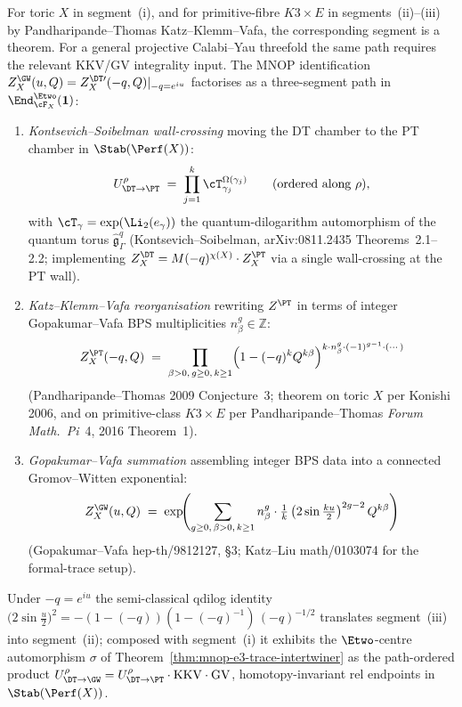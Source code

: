 \begin{theorem}
\label{thm:mnop-homotopy-three-segments}
For toric $X$ in segment~\textup{(i)}, and for primitive-fibre
$K3\times E$ in segments~\textup{(ii)}--\textup{(iii)} by
Pandharipande--Thomas Katz--Klemm--Vafa, the corresponding segment is a
theorem. For a general projective Calabi--Yau threefold the same path
requires the relevant KKV/GV integrality input.
The MNOP identification
$Z^{\GW}_X(u, Q) = Z^{\DT\prime}_X(-q, Q)|_{-q = e^{iu}}$ factorises
as a three-segment path in $\End^{\Etwo}_{\cF_X}(\mathbf{1})$:
\begin{enumerate}[label=\textup{(\roman*)}]
\item \emph{Kontsevich--Soibelman wall-crossing} moving the DT chamber
to the PT chamber in $\Stab(\Perf(X))$:
\[
 U^\rho_{\DT\to\PT}
 \;=\; \prod_{j=1}^k \cT_{\gamma_j}^{\Omega(\gamma_j)}
 \qquad (\text{ordered along } \rho),
\]
with $\cT_\gamma = \exp(\Li_2(e_\gamma))$ the quantum-dilogarithm
automorphism of the quantum torus $\widehat{\mathfrak{g}}^q_\Gamma$
(Kontsevich--Soibelman, arXiv:0811.2435 Theorems~2.1--2.2;
implementing $Z^{\DT}_X = M(-q)^{\chi(X)} \cdot Z^{\PT}_X$ via a
single wall-crossing at the PT wall).
\item \emph{Katz--Klemm--Vafa reorganisation} rewriting $Z^{\PT}$ in
terms of integer Gopakumar--Vafa BPS multiplicities
$n^g_\beta\in\mathbb{Z}$:
\[
 Z^{\PT}_X(-q, Q)
 \;=\; \prod_{\beta > 0,\, g\geq 0,\, k\geq 1}
 \Bigl(1 - (-q)^k Q^{k\beta}\Bigr)^{k\cdot n^g_\beta\cdot(-1)^{g-1}\cdot(\cdots)}
\]
(Pandharipande--Thomas 2009 Conjecture~3; theorem on toric $X$ per
Konishi 2006, and on primitive-class $K3\times E$ per
Pandharipande--Thomas \emph{Forum Math.~Pi}~4, 2016 Theorem~1).
\item \emph{Gopakumar--Vafa summation} assembling integer BPS data into
a connected Gromov--Witten exponential:
\[
 Z^{\GW}_X(u, Q)
 \;=\;
 \exp\!\Biggl(\sum_{g\geq 0,\, \beta > 0,\, k\geq 1}
 n^g_\beta \cdot \tfrac{1}{k}\,
 \bigl(2\sin\tfrac{ku}{2}\bigr)^{2g-2}\, Q^{k\beta}\Biggr)
\]
(Gopakumar--Vafa hep-th/9812127, \S3; Katz--Liu math/0103074 for the
formal-trace setup).
\end{enumerate}
Under $-q = e^{iu}$ the semi-classical qdilog identity
$\bigl(2\sin\tfrac{u}{2}\bigr)^2 = -(1 - (-q))(1 - (-q)^{-1})\,(-q)^{-1/2}$
translates segment~\textup{(iii)} into segment~\textup{(ii)}; composed
with segment~\textup{(i)} it exhibits the $\Etwo$-centre automorphism
$\sigma$ of Theorem~\ref{thm:mnop-e3-trace-intertwiner} as the
path-ordered product
$U^\rho_{\DT\to\GW} = U^\rho_{\DT\to\PT}\cdot\mathrm{KKV}\cdot\mathrm{GV}$,
homotopy-invariant rel endpoints in $\Stab(\Perf(X))$.
\end{theorem}

